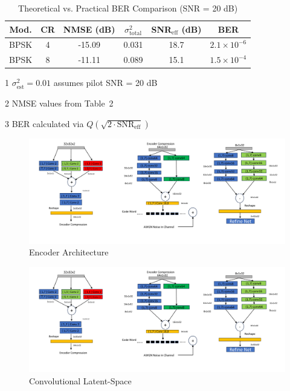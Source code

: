 \documentclass[lettersize,journal]{IEEEtran}
\begin{document}
\begin{table}[ht]
	\centering
	\begin{threeparttable}
	\caption{Theoretical vs. Practical BER Comparison (SNR = 20 dB)}
	\label{tab:ber_analysis}
	\begin{tabular}{|c|c|c|c|c|c|}
	\hline
	\textbf{Mod.} & \textbf{CR} & \textbf{NMSE (dB)} & $\sigma^2_{\text{total}}$ & \textbf{SNR$_{\text{eff}}$ (dB)} & \textbf{BER} \\
	\hline
	BPSK & 4 & -15.09 & 0.031 & 18.7 & $2.1 \times 10^{-6}$ \\
	BPSK & 8 & -11.11 & 0.089 & 15.1 & $1.5 \times 10^{-4}$ \\
	\hline
	\end{tabular}
	\begin{tablenotes}
	\item[1] $\sigma^2_{\text{est}} = 0.01$ assumes pilot SNR = 20 dB
	\item[2] NMSE values from Table~2
	\item[3] BER calculated via $Q(\sqrt{2\cdot\text{SNR}_{\text{eff}}})$
	\end{tablenotes}
	\end{threeparttable}
\end{table}

\begin{figure}[ht]
	\centering
	\includegraphics[width=0.6\linewidth]{Model_a.pdf}
	\caption{Encoder Architecture}
	\label{fig:figure1}
\end{figure}

\begin{figure}[ht]
	\centering
	\includegraphics[width=0.8\linewidth]{Model_b.pdf}
	\caption{Convolutional Latent-Space}
	\label{fig:figure2}
\end{figure}
\end{document}
